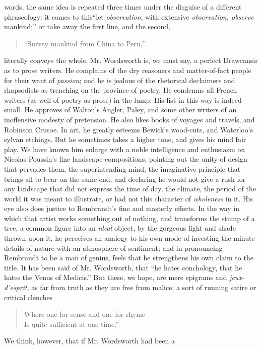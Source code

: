 words, the same idea is repeated three times under the disguise of
a different phraseology: it comes to this\textemdash ``let
\emph{observation}, with extensive \emph{observation, observe}
mankind;'' or take away the first line, and the second,
\begin{quote}
  ``Survey mankind from China to Peru,''
\end{quote}
literally conveys the whole. Mr. Wordsworth is, we
must say, a perfect Drawcansir as to prose writers. He complains
of the dry reasoners and matter-of-fact people for their want of
\emph{passion}; and he is jealous of the rhetorical declaimers and
rhapsodists as trenching on the province of poetry. He condemns
all French writers (as well of poetry as prose) in the lump. His
list in this way is indeed small. He approves of Walton's Angler,
Paley, and some other writers of an inoffensive modesty of
pretension. He also likes books of voyages and travels, and
Robinson Crusoe. In art, he greatly esteems Bewick's wood-cuts,
and Waterloo's sylvan etchings. But he sometimes takes a higher
tone, and gives his mind fair play. We have known him enlarge with
a noble intelligence and enthusiasm on Nicolas Poussin's fine
landscape-compositions, pointing out the unity of design that
pervades them, the superintending mind, the imaginative principle
that brings all to bear on the same end; and declaring he would
not give a rush for any landscape that did not express the time of
day, the climate, the period of the world it was meant to
illustrate, or had not this character of \emph{wholeness} in
it. His eye also does justice to Rembrandt's fine and masterly
effects. In the way in which that artist works something out of
nothing, and transforms the stump of a tree, a common figure into
an \emph{ideal} object, by the gorgeous light and shade thrown
upon it, he perceives an analogy to his own mode of investing the
minute details of nature with an atmosphere of sentiment; and in
pronouncing Rembrandt to be a man of genius, feels that he
strengthens his own claim to the title. It has been said of
Mr. Wordsworth, that ``he hates conchology, that he hates the
Venus of Medicis.'' But these, we hope, are mere epigrams and
\emph{jeux-d'esprit}, as far from truth as they are free from
malice; a sort of running satire or critical clenches\textemdash
\begin{verse} Where one for sense and one for
rhyme \\ Is quite sufficient at one time.''
\end{verse} We think, however, that if Mr. Wordsworth had been a

